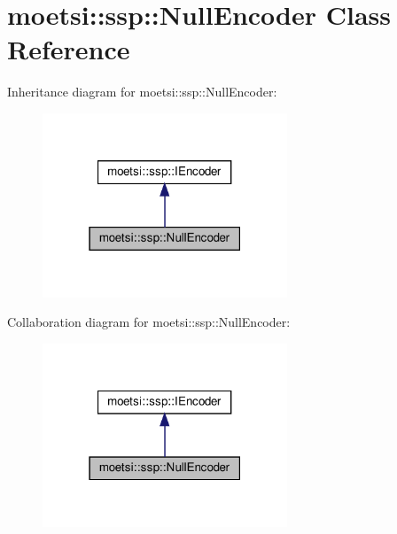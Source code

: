 \hypertarget{classmoetsi_1_1ssp_1_1NullEncoder}{}\section{moetsi\+:\+:ssp\+:\+:Null\+Encoder Class Reference}
\label{classmoetsi_1_1ssp_1_1NullEncoder}


Inheritance diagram for moetsi\+:\+:ssp\+:\+:Null\+Encoder\+:\nopagebreak
\begin{figure}[H]
\begin{center}
\leavevmode
\includegraphics[width=207pt]{classmoetsi_1_1ssp_1_1NullEncoder__inherit__graph}
\end{center}
\end{figure}


Collaboration diagram for moetsi\+:\+:ssp\+:\+:Null\+Encoder\+:\nopagebreak
\begin{figure}[H]
\begin{center}
\leavevmode
\includegraphics[width=207pt]{classmoetsi_1_1ssp_1_1NullEncoder__coll__graph}
\end{center}
\end{figure}

